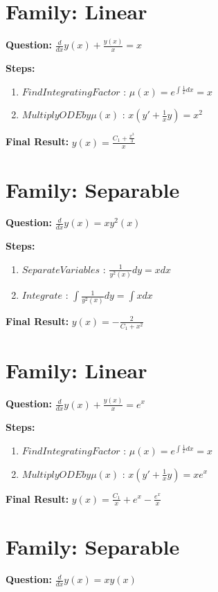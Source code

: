 \documentclass{article}
\begin{document}
\section*{Family: Linear}
\textbf{Question:} $\frac{d}{d x} y{\left(x \right)} + \frac{y{\left(x \right)}}{x} = x$

\textbf{Steps:}
\begin{enumerate}
\item $Find Integrating Factor$ :  $\mu(x) = e^{\int \frac{1}{x} dx} = x$
\item $Multiply ODE by \mu(x)$ :  $x(y' + \frac{1}{x}y) = x^{2}$
\end{enumerate}
\textbf{Final Result:} $y{\left(x \right)} = \frac{C_{1} + \frac{x^{3}}{3}}{x}$

\section*{Family: Separable}
\textbf{Question:} $\frac{d}{d x} y{\left(x \right)} = x y^{2}{\left(x \right)}$

\textbf{Steps:}
\begin{enumerate}
\item $Separate Variables$ :  $\frac{1}{y^{2}{\left(x \right)}} dy = x dx$
\item $Integrate$ :  $\int \frac{1}{y^{2}{\left(x \right)}} dy = \int x dx$
\end{enumerate}
\textbf{Final Result:} $y{\left(x \right)} = - \frac{2}{C_{1} + x^{2}}$

\section*{Family: Linear}
\textbf{Question:} $\frac{d}{d x} y{\left(x \right)} + \frac{y{\left(x \right)}}{x} = e^{x}$

\textbf{Steps:}
\begin{enumerate}
\item $Find Integrating Factor$ :  $\mu(x) = e^{\int \frac{1}{x} dx} = x$
\item $Multiply ODE by \mu(x)$ :  $x(y' + \frac{1}{x}y) = x e^{x}$
\end{enumerate}
\textbf{Final Result:} $y{\left(x \right)} = \frac{C_{1}}{x} + e^{x} - \frac{e^{x}}{x}$

\section*{Family: Separable}
\textbf{Question:} $\frac{d}{d x} y{\left(x \right)} = x y{\left(x \right)}$
\end{document}
